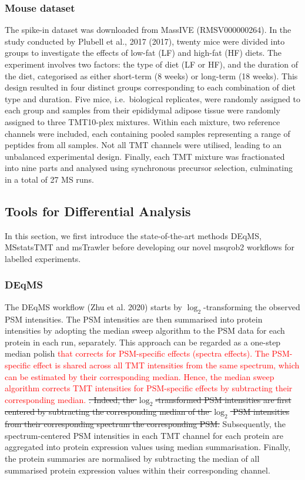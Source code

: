 \documentclass[
  letterpaper,
  DIV=11,
  numbers=noendperiod]{scrartcl}
\begin{document}
\subsubsection{Mouse dataset}

The spike-in dataset was downloaded from MassIVE (RMSV000000264). In the
study conducted by Plubell et al., 2017 (2017), twenty mice were divided
into groups to investigate the effects of low-fat (LF) and high-fat (HF)
diets. The experiment involves two factors: the type of diet (LF or HF),
and the duration of the diet, categorised as either short-term (8 weeks)
or long-term (18 weeks). This design resulted in four distinct groups
corresponding to each combination of diet type and duration. Five mice,
i.e.~biological replicates, were randomly assigned to each group and
samples from their epididymal adipose tissue were randomly assigned to
three TMT10-plex mixtures. Within each mixture, two reference channels
were included, each containing pooled samples representing a range of
peptides from all samples. Not all TMT channels were utilised, leading
to an unbalanced experimental design. Finally, each TMT mixture was
fractionated into nine parts and analysed using synchronous precursor
selection, culminating in a total of 27 MS runs.

\subsection{Tools for Differential Analysis}

In this section, we first introduce the state-of-the-art methods DEqMS,
MSstatsTMT and msTrawler before developing our novel msqrob2 workflows
for labelled experiments.

\subsubsection{DEqMS}

The DEqMS workflow (Zhu et al. 2020) starts by \(\log_2\)-transforming
the observed PSM intensities. The PSM intensities are then summarised
into protein intensities by adopting the median sweep algorithm to the
PSM data for each protein in each run, separately. This approach can be
regarded as a one-step median polish
\textcolor{red}{that corrects for PSM-specific effects (spectra effects). The PSM-specific effect is shared across all TMT intensities from the same spectrum, which can be estimated by their corresponding median. Hence, the median sweep algorithm corrects TMT intensities for PSM-specific effects by subtracting their corresponding median.}
\sout{. Indeed, the $\log_2$-transformed PSM intensities are first centered by subtracting the corresponding median of the $\log_2$ PSM intensities from their corresponding spectrum the corresponding PSM.}
Subsequently, the spectrum-centered PSM intensities in each TMT channel
for each protein are aggregated into protein expression values using
median summarisation. Finally, the protein summaries are normalised by
subtracting the median of all summarised protein expression values
within their corresponding channel.
\end{document}

